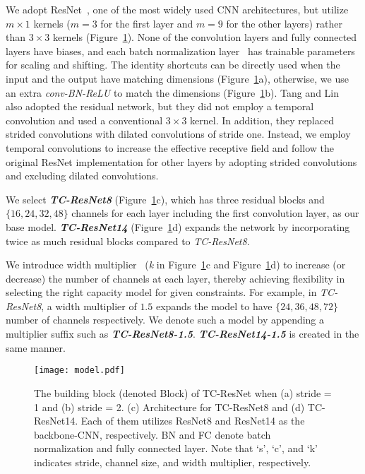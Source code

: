 \documentclass[a4paper]{article}
\begin{document}
We adopt ResNet~\cite{he-cvpr-2016-resnet}, one of the most widely used CNN architectures, but utilize $m \times 1$ kernels ($m = 3$ for the first layer and $m = 9$ for the other layers) rather than $3 \times 3$ kernels (Figure~\ref{fig:model}).
None of the convolution layers and fully connected layers have biases, and each batch normalization layer~\cite{ioffe-arxiv-2015-batchnormalization} has trainable parameters for scaling and shifting.
The identity shortcuts can be directly used when the input and the output have matching dimensions (Figure~\ref{fig:model}a), otherwise, we use an extra \emph{conv-BN-ReLU} to match the dimensions (Figure~\ref{fig:model}b).
Tang and Lin~\cite{tang-icassp-2018-residual} also adopted the residual network, but they did not employ a temporal convolution and used a conventional $3 \times 3$ kernel.
In addition, they replaced strided convolutions with dilated convolutions of stride one.
Instead, we employ temporal convolutions to increase the effective receptive field and follow the original ResNet implementation for other layers by adopting strided convolutions and excluding dilated convolutions.

We select \textbf{\emph{TC-ResNet8}} (Figure~\ref{fig:model}c), which has three residual blocks and $\{16, 24, 32, 48\}$ channels for each layer including the first convolution layer, as our base model.
\textbf{\emph{TC-ResNet14}} (Figure~\ref{fig:model}d) expands the network by incorporating twice as much residual blocks compared to \emph{TC-ResNet8}.

We introduce width multiplier~\cite{howard-arxiv-2017-mobilenet} (\emph{k} in Figure~\ref{fig:model}c and Figure~\ref{fig:model}d) to increase (or decrease) the number of channels at each layer, thereby achieving flexibility in selecting the right capacity model for given constraints.
For example, in \emph{TC-ResNet8}, a width multiplier of $1.5$ expands the model to have $\{24, 36, 48, 72\}$ number of channels respectively.
We denote such a model by appending a multiplier suffix such as \textbf{\emph{TC-ResNet8-1.5}}.
\textbf{\emph{TC-ResNet14-1.5}} is created in the same manner.

\begin{figure}[t]
    \texttt{[image: model.pdf]}
    \caption{The building block (denoted Block) of TC-ResNet when (a) stride = 1 and (b) stride = 2.
    (c) Architecture for TC-ResNet8 and (d) TC-ResNet14.
    Each of them utilizes ResNet8 and ResNet14 as the backbone-CNN, respectively.
    BN and FC denote batch normalization and fully connected layer.
    Note that `s', `c', and `k' indicates stride, channel size, and width multiplier, respectively.
    }
    \vspace{-0.2cm}
    \label{fig:model}
\end{figure}
\end{document}
